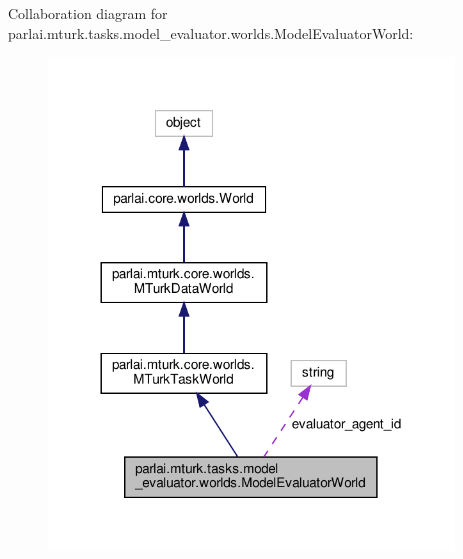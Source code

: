 Collaboration diagram for parlai.\+mturk.\+tasks.\+model\+\_\+evaluator.\+worlds.\+Model\+Evaluator\+World\+:
\nopagebreak
\begin{figure}[H]
\begin{center}
\leavevmode
\includegraphics[width=305pt]{classparlai_1_1mturk_1_1tasks_1_1model__evaluator_1_1worlds_1_1ModelEvaluatorWorld__coll__graph}
\end{center}
\end{figure}

